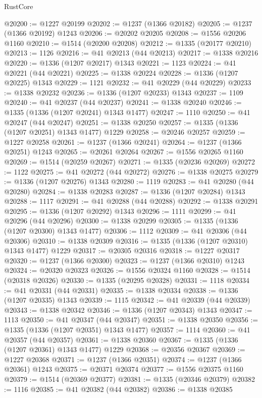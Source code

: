 \begin{lexlean}{RustCore}
\begin{coremodule}
@20200 := @1227 @20199
@20202 := @1237 (@1366 @20182)
@20205 := @1237 (@1366 @20192) @1243
@20206 := @20202 @20205
@20208 := @1556 @20206 @1160
@20210 := @1514 (@20200 @20208)
@20212 := @1335 (@20177 @20210)
@20213 := 1126
@20216 := @41 @20213 (@44 @20213)
@20217 := @1338 @20216
@20220 := @1336 (@1207 @20217) @1343
@20221 := 1123
@20224 := @41 @20221 (@44 @20221)
@20225 := @1338 @20224
@20228 := @1336 (@1207 @20225) @1343
@20229 := 1121
@20232 := @41 @20229 (@44 @20229)
@20233 := @1338 @20232
@20236 := @1336 (@1207 @20233) @1343
@20237 := 1109
@20240 := @41 @20237 (@44 @20237)
@20241 := @1338 @20240
@20246 := @1335 (@1336 (@1207 @20241) @1343 @1477)
@20247 := 1110
@20250 := @41 @20247 (@44 @20247)
@20251 := @1338 @20250
@20257 := @1335 (@1336 (@1207 @20251) @1343 @1477) @1229
@20258 := @20246 @20257
@20259 := @1227 @20258
@20261 := @1237 (@1366 @20241)
@20264 := @1237 (@1366 @20251) @1243
@20265 := @20261 @20264
@20267 := @1556 @20265 @1160
@20269 := @1514 (@20259 @20267)
@20271 := @1335 (@20236 @20269)
@20272 := 1122
@20275 := @41 @20272 (@44 @20272)
@20276 := @1338 @20275
@20279 := @1336 (@1207 @20276) @1343
@20280 := 1119
@20283 := @41 @20280 (@44 @20280)
@20284 := @1338 @20283
@20287 := @1336 (@1207 @20284) @1343
@20288 := 1117
@20291 := @41 @20288 (@44 @20288)
@20292 := @1338 @20291
@20295 := @1336 (@1207 @20292) @1343
@20296 := 1111
@20299 := @41 @20296 (@44 @20296)
@20300 := @1338 @20299
@20305 := @1335 (@1336 (@1207 @20300) @1343 @1477)
@20306 := 1112
@20309 := @41 @20306 (@44 @20306)
@20310 := @1338 @20309
@20316 := @1335 (@1336 (@1207 @20310) @1343 @1477) @1229
@20317 := @20305 @20316
@20318 := @1227 @20317
@20320 := @1237 (@1366 @20300)
@20323 := @1237 (@1366 @20310) @1243
@20324 := @20320 @20323
@20326 := @1556 @20324 @1160
@20328 := @1514 (@20318 @20326)
@20330 := @1335 (@20295 @20328)
@20331 := 1118
@20334 := @41 @20331 (@44 @20331)
@20335 := @1338 @20334
@20338 := @1336 (@1207 @20335) @1343
@20339 := 1115
@20342 := @41 @20339 (@44 @20339)
@20343 := @1338 @20342
@20346 := @1336 (@1207 @20343) @1343
@20347 := 1113
@20350 := @41 @20347 (@44 @20347)
@20351 := @1338 @20350
@20356 := @1335 (@1336 (@1207 @20351) @1343 @1477)
@20357 := 1114
@20360 := @41 @20357 (@44 @20357)
@20361 := @1338 @20360
@20367 := @1335 (@1336 (@1207 @20361) @1343 @1477) @1229
@20368 := @20356 @20367
@20369 := @1227 @20368
@20371 := @1237 (@1366 @20351)
@20374 := @1237 (@1366 @20361) @1243
@20375 := @20371 @20374
@20377 := @1556 @20375 @1160
@20379 := @1514 (@20369 @20377)
@20381 := @1335 (@20346 @20379)
@20382 := 1116
@20385 := @41 @20382 (@44 @20382)
@20386 := @1338 @20385

\end{coremodule}
\end{lexlean}
